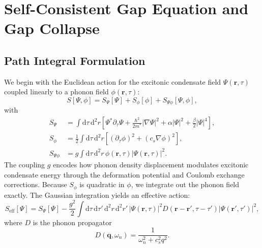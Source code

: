 \documentclass[11pt,letterpaper]{article}
\begin{document}
\section{Self-Consistent Gap Equation and Gap Collapse}
\label{sec:gap}

\subsection{Path Integral Formulation}

We begin with the Euclidean action for the excitonic condensate field $\Psi(\mathbf{r},\tau)$ coupled linearly to a phonon field $\phi(\mathbf{r},\tau)$:
\begin{equation}
S[\Psi,\phi] = S_\Psi[\Psi] + S_\phi[\phi] + S_{\Psi\phi}[\Psi,\phi],
\end{equation}
with
\begin{align}
S_\Psi &= \int \mathrm{d}\tau \, \mathrm{d}^2 r \left[ \Psi^* \partial_\tau \Psi + \frac{\hbar^2}{2m^*} |\nabla\Psi|^2 + \alpha |\Psi|^2 + \frac{\beta}{2} |\Psi|^4 \right], \\
S_\phi &= \frac{1}{2} \int \mathrm{d}\tau \, \mathrm{d}^2 r \left[ (\partial_\tau \phi)^2 + (c_s \nabla\phi)^2 \right], \\
S_{\Psi\phi} &= g \int \mathrm{d}\tau \, \mathrm{d}^2 r \, \phi(\mathbf{r},\tau) |\Psi(\mathbf{r},\tau)|^2.
\end{align}
The coupling $g$ encodes how phonon density displacement modulates excitonic condensate energy through the deformation potential and Coulomb exchange corrections. Because $S_\phi$ is quadratic in $\phi$, we integrate out the phonon field exactly. The Gaussian integration yields an effective action:
\begin{equation}
S_{\text{eff}}[\Psi] = S_\Psi[\Psi] - \frac{g^2}{2} \int \mathrm{d}\tau \, \mathrm{d}\tau' \, \mathrm{d}^2 r \, \mathrm{d}^2 r' \, |\Psi(\mathbf{r},\tau)|^2 D(\mathbf{r}-\mathbf{r}',\tau-\tau') |\Psi(\mathbf{r}',\tau')|^2,
\end{equation}
where $D$ is the phonon propagator
\begin{equation}
D(\mathbf{q},\omega_n) = \frac{1}{\omega_n^2 + c_s^2 q^2}.
\end{equation}
\end{document}
